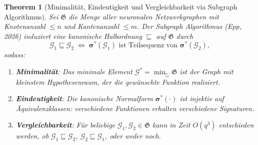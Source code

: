 \documentclass[12pt, a4paper, openany]{report}
\newtheorem{theorem}{Theorem}[chapter]
\newcommand{\calG}{\mathcal{G}}
\begin{document}
\begin{theorem}[Minimalität, Eindeutigkeit und Vergleichbarkeit via Subgraph Algorithmus]
\label{thm:minimal_unique_comparable}
Sei $\mathfrak{G}$ die Menge aller neuronalen Netzwerkgraphen mit Knotenanzahl
$\leq n$ und Kantenanzahl $\leq m$.  Der Subgraph Algorithmus (Epp, 2026)
induziert eine kanonische Halbordnung $\sqsubseteq$ auf $\mathfrak{G}$ durch
\[
  \calG_1 \sqsubseteq \calG_2
  \;\Leftrightarrow\;
  \bm{\sigma}^*(\calG_1) \text{ ist Teilsequenz von } \bm{\sigma}^*(\calG_2),
\]
sodass:
\begin{enumerate}[label=(\roman*)]
  \item \textbf{Minimalität}: Das minimale Element $\calG^* = \min_{\sqsubseteq} \mathfrak{G}$
    ist der Graph mit kleinstem Hypothesenraum, der die gewünschte Funktion realisiert.
  \item \textbf{Eindeutigkeit}: Die kanonische Normalform $\bm{\sigma}^*(\cdot)$
    ist injektiv auf Äquivalenzklassen: verschiedene Funktionen erhalten
    verschiedene Signaturen.
  \item \textbf{Vergleichbarkeit}: Für beliebige $\calG_1, \calG_2 \in \mathfrak{G}$
    kann in Zeit $O(q^3)$ entschieden werden, ob $\calG_1 \sqsubseteq \calG_2$,
    $\calG_2 \sqsubseteq \calG_1$, oder weder noch.
\end{enumerate}
\end{theorem}
\end{document}
